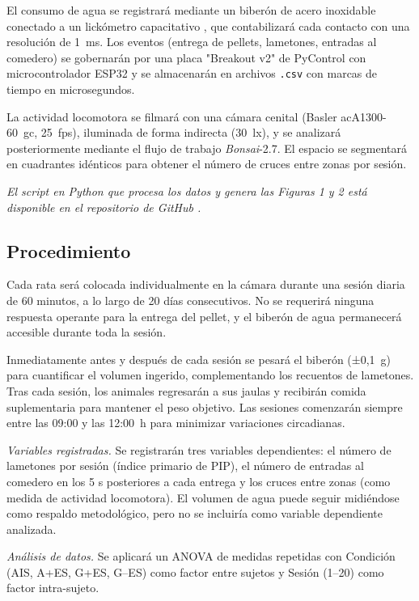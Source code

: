 \documentclass[12pt,a4paper]{article}
\begin{document}
\begin{multicols}{2}
El consumo de agua se registrará mediante un biberón de acero inoxidable conectado a un lickómetro capacitativo \citep{pycontrol_lickometer}, que contabilizará cada contacto con una resolución de 1~ms. Los eventos (entrega de pellets, lametones, entradas al comedero) se gobernarán por una placa "Breakout v2" de PyControl con microcontrolador ESP32 y se almacenarán en archivos \texttt{.csv} con marcas de tiempo en microsegundos.

La actividad locomotora se filmará con una cámara cenital (Basler acA1300-60~gc, 25~fps), iluminada de forma indirecta (30~lx), y se analizará posteriormente mediante el flujo de trabajo \textit{Bonsai}-2.7. El espacio se segmentará en cuadrantes idénticos para obtener el número de cruces entre zonas por sesión.

\textit{El script en Python que procesa los datos y genera las Figuras 1 y 2 está disponible en el repositorio de GitHub \citep{Pena2025}.
}

\subsection*{Procedimiento}

Cada rata será colocada individualmente en la cámara durante una sesión diaria de 60 minutos, a lo largo de 20 días consecutivos. No se requerirá ninguna respuesta operante para la entrega del pellet, y el biberón de agua permanecerá accesible durante toda la sesión.

Inmediatamente antes y después de cada sesión se pesará el biberón (±0,1~g) para cuantificar el volumen ingerido, complementando los recuentos de lametones. Tras cada sesión, los animales regresarán a sus jaulas y recibirán comida suplementaria para mantener el peso objetivo. Las sesiones comenzarán siempre entre las 09:00 y las 12:00~h para minimizar variaciones circadianas.

\textit{Variables registradas.} Se registrarán tres variables dependientes: el número de lametones por sesión (índice primario de PIP), el número de entradas al comedero en los 5 s posteriores a cada entrega y los cruces entre zonas (como medida de actividad locomotora). El volumen de agua puede seguir midiéndose como respaldo metodológico, pero no se incluiría como variable dependiente analizada.


\textit{Análisis de datos.} Se aplicará un ANOVA de medidas repetidas con Condición (AIS, A+ES, G+ES, G--ES) como factor entre sujetos y Sesión (1–20) como factor intra-sujeto.


\end{multicols}
\end{document}
